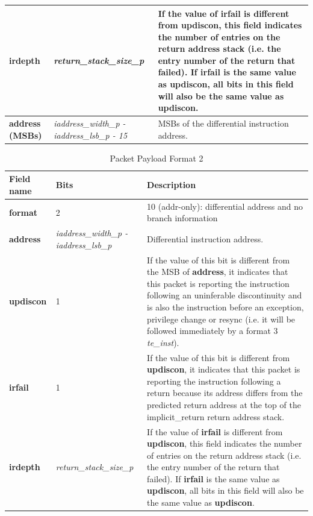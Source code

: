 \begin{table}[htp]
\begin{tabulary}{\textwidth}{|l|p{35mm}|p{80mm}|}
    \hline
    \textbf{irdepth}	& \textit {return\_stack\_size\_p} & 
                If the value of \textbf{irfail} is different from \textbf{updiscon}, this field indicates 
                the number of entries on the return address stack (i.e. the entry number of the return that
                failed).  If \textbf{irfail} is the same value as \textbf{updiscon}, all bits in this field 
                will also be the same value as \textbf{updiscon}. \\
    \hline
    \textbf{address (MSBs)}	& \textit {iaddress\_width\_p - iaddress\_lsb\_p - 15} & 
                MSBs of the differential instruction address.\\
    \hline
  \end{tabulary}
\end{table}


\begin{table}[!h]
  \centering
  \caption{Packet Payload Format 2}
  \label{tab:te_inst2}
  \begin{tabulary}{\textwidth}{|l|p{35mm}|p{80mm}|}
    \hline
    {\bf Field name} & {\bf Bits} & {\bf Description} \\
    \hline
    \textbf{format}	& 2	& 10 (addr-only): differential address and no branch information\\
    \hline
    \textbf{address} & \textit {iaddress\_width\_p - iaddress\_lsb\_p} & 
              Differential instruction address.\\ 
    \hline
    \textbf{updiscon}	& 1 & 
                If the value of this bit is different from the MSB of \textbf{address}, it indicates that this 
                packet is reporting the instruction following an uninferable discontinuity and is also the 
                instruction before an exception, privilege change or resync 
                (i.e. it will be followed immediately by a format 3 \textit{te\_inst}).\\
    \hline
    \textbf{irfail}	& 1 & 
                If the value of this bit is different from \textbf{updiscon}, it indicates that this
                packet is reporting the instruction following a return because its address differs from 
                the predicted return address at the top of the implicit\_return return address stack.\\
    \hline
    \textbf{irdepth}	& \textit {return\_stack\_size\_p} & 
                If the value of \textbf{irfail} is different from \textbf{updiscon}, this field indicates 
                the number of entries on the return address stack (i.e. the entry number of the return that
                failed).  If \textbf{irfail} is the same value as \textbf{updiscon}, all bits in this field 
                will also be the same value as \textbf{updiscon}. \\
    \hline
  \end{tabulary}
\end{table}


